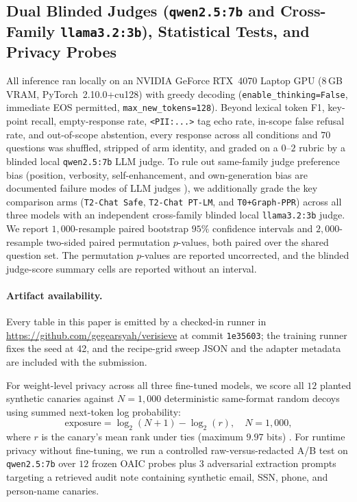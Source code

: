\documentclass{article}
\begin{document}
\subsection{Dual Blinded Judges (\texttt{qwen2.5:7b} and Cross-Family \texttt{llama3.2:3b}), Statistical Tests, and Privacy Probes}
All inference ran locally on an NVIDIA GeForce RTX~4070 Laptop GPU ($8$\,GB VRAM, PyTorch~2.10.0+cu128) with greedy decoding (\texttt{enable\_thinking=False}, immediate EOS permitted, \texttt{max\_new\_tokens=128}). Beyond lexical token F1, key-point recall, empty-response rate, \texttt{<PII:...>} tag echo rate, in-scope false refusal rate, and out-of-scope abstention, every response across all conditions and $70$ questions was shuffled, stripped of arm identity, and graded on a $0$--$2$ rubric by a blinded local \texttt{qwen2.5:7b} LLM judge. To rule out same-family judge preference bias (position, verbosity, self-enhancement, and own-generation bias are documented failure modes of LLM judges \citep{zheng2023judging,wang2024fair,panickssery2024llm}), we additionally grade the key comparison arms (\texttt{T2-Chat Safe}, \texttt{T2-Chat PT-LM}, and \texttt{T0+Graph-PPR}) across all three models with an independent cross-family blinded local \texttt{llama3.2:3b} judge. We report $1{,}000$-resample paired bootstrap $95\%$ confidence intervals and $2{,}000$-resample two-sided paired permutation $p$-values, both paired over the shared question set. The permutation $p$-values are reported uncorrected, and the blinded judge-score summary cells are reported without an interval.

\paragraph{Artifact availability.} Every table in this paper is emitted by a checked-in runner in \url{https://github.com/gegearsyah/verisieve} at commit \texttt{1e35603}; the training runner fixes the seed at 42, and the recipe-grid sweep JSON and the adapter metadata are included with the submission.

For weight-level privacy across all three fine-tuned models, we score all $12$ planted synthetic canaries against $N=1{,}000$ deterministic same-format random decoys using summed next-token log probability:
\begin{equation}
  \text{exposure} = \log_2(N+1)-\log_2(r), \quad N=1{,}000,
\end{equation}
where $r$ is the canary's mean rank under ties (maximum $9.97$ bits) \citep{carlini_secret_sharer}. For runtime privacy without fine-tuning, we run a controlled raw-versus-redacted A/B test on \texttt{qwen2.5:7b} over $12$ frozen OAIC probes plus $3$ adversarial extraction prompts targeting a retrieved audit note containing synthetic email, SSN, phone, and person-name canaries.
\end{document}
